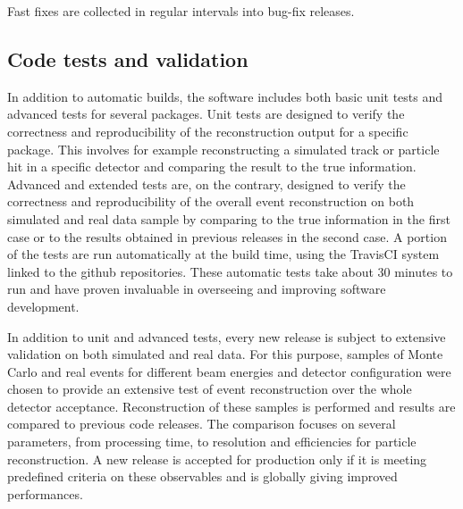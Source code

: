 \documentclass[3p,times,twocolumn]{elsarticle}
\begin{document}
Fast fixes are collected in regular intervals into bug-fix releases.

\subsection{Code tests and validation}\label{sec:tests}
In addition to automatic builds, the software includes both basic unit tests and advanced tests for several packages. Unit tests are designed to verify the correctness and reproducibility of the reconstruction output for a specific package. This involves for example reconstructing a simulated track or particle hit in a specific detector and comparing the result to the true information. Advanced and extended tests are, on the contrary, designed to verify the correctness and reproducibility of the overall event reconstruction on both simulated and real data sample by comparing to the true information in the first case or to the results obtained in previous releases in the second case. A portion of the tests are run automatically at the build time, using the TravisCI system linked to the github repositories.  These automatic tests take about 30 minutes to run and have proven invaluable in overseeing and improving software development.

In addition to unit and advanced tests, every new release is subject to extensive validation on both simulated and real data. For this purpose, samples of Monte Carlo and real events for different beam energies and detector configuration were chosen to provide an extensive test of event reconstruction over the whole detector acceptance. Reconstruction of these samples is performed and results are compared to previous code releases. The comparison focuses on several parameters, from processing time, to resolution and efficiencies for particle reconstruction. A new release is accepted for production only if it is meeting predefined criteria on these observables and is globally giving improved performances. 
\end{document}
